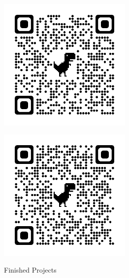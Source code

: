 \documentclass[letterpaper,10pt]{article}
\begin{document}
\begin{center}
    \begin{minipage}{0.45\textwidth}
        \centering
        \includegraphics[width=6.5cm, height=6.5cm]{Figures/EBrakeBias.png}
        \label{fig:image3}
    \end{minipage}
    \hspace{0.05\textwidth}
    \begin{minipage}{0.45\textwidth}
        \centering
        \includegraphics[width=6.5cm, height=6.5cm]{Figures/CustomCane.png}
        \label{fig:image4}
    \end{minipage}
    Finished Projects
    \vspace{0.5cm} %


\end{center}
\end{document}

